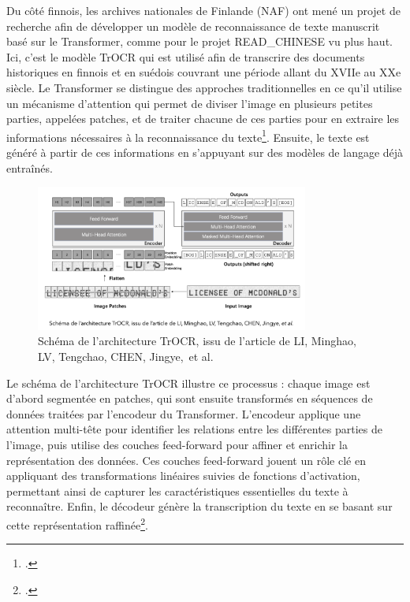 \documentclass[a4paper,12pt,twoside]{book}
\begin{document}
	Du côté finnois, les archives nationales de Finlande (NAF) ont mené un projet de recherche afin de développer un modèle de reconnaissance de texte manuscrit basé sur le Transformer, comme pour le projet READ\_CHINESE vu plus haut. Ici, c’est le modèle TrOCR qui est utilisé afin de transcrire des documents historiques en finnois et en suédois couvrant une période allant du XVIIe au XXe siècle. Le Transformer se distingue des approches traditionnelles en ce qu’il utilise un mécanisme d’attention qui permet de diviser l’image en plusieurs petites parties, appelées patches, et de traiter chacune de ces parties pour en extraire les informations nécessaires à la reconnaissance du texte\footcite{li_trocr_2023}. Ensuite, le texte est généré à partir de ces informations en s’appuyant sur des modèles de langage déjà entraînés.
	\\
	\begin{figure}[h!]
		\centering
		\includegraphics[width=0.8\textwidth]{images/TrOcr_schem.png}
		\caption{Schéma de l’architecture TrOCR, issu de l’article de LI, Minghao, LV, Tengchao, CHEN, Jingye, et al. }
		\label{fig:monimage}
	\end{figure}
	
	Le schéma de l’architecture TrOCR illustre ce processus : chaque image est d’abord segmentée en patches, qui sont ensuite transformés en séquences de données traitées par l’encodeur du Transformer. L’encodeur applique une attention multi-tête pour identifier les relations entre les différentes parties de l’image, puis utilise des couches feed-forward pour affiner et enrichir la représentation des données. Ces couches feed-forward jouent un rôle clé en appliquant des transformations linéaires suivies de fonctions d’activation, permettant ainsi de capturer les caractéristiques essentielles du texte à reconnaître. Enfin, le décodeur génère la transcription du texte en se basant sur cette représentation raffinée\footcite{riikka_handwritten_nodate}.
	
\end{document}
